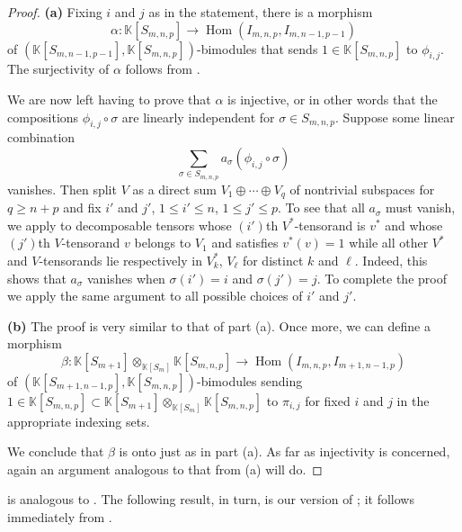 \documentclass[11pt]{article}
\theoremstyle{plain}
\theoremstyle{nonumberplain}
\theoremstyle{plain}
\theoremstyle{nonumberplain}
\newtheorem{proof}{Proof}
\newcommand\bK{{\mathbb K}}
\DeclareMathOperator{\Hom}{\mathrm{Hom}}
\begin{document}
\begin{proof}

{\bf (a)} Fixing $i$ and $j$ as in the statement, there is a morphism
\begin{equation*}
  \alpha:\bK[S_{m,n,p}] \to \Hom(I_{m,n,p},I_{m,n-1,p-1})
\end{equation*}
of $(\bK[S_{m,n-1,p-1}],\bK[S_{m,n,p}])$-bimodules that sends $1\in \bK[S_{m,n,p}]$ to $\phi_{i,j}$. 
The surjectivity of $\alpha$ follows from .

We are now left having to prove that $\alpha$ is injective, or in other words that the compositions $\phi_{i,j}\circ \sigma$ are linearly independent for $\sigma\in S_{m,n,p}$. 
Suppose some linear combination 
\begin{equation}\label{eq.le.11}
  \sum_{\sigma\in S_{m,n,p}} a_\sigma (\phi_{i,j}\circ \sigma)
\end{equation}
vanishes. Then split $V$ as a direct sum $V_1\oplus\cdots\oplus V_q$ of nontrivial subspaces for $q\ge n+p$ and fix $i'$ and $j'$, $1\leq i'\leq n$, $1\leq j'\leq p$. %
To see that all $a_\sigma$ must vanish, we apply  to decomposable tensors whose $(i')$th $V^*$-tensorand is $v^*$ and whose $(j')$th $V$-tensorand $v$ belongs to $V_1$ and satisfies $v^*(v)=1$ while all other $V^*$ and $V$-tensorands lie respectively in $V^*_k$, $V_\ell$ for distinct $k$ and $\ell$. Indeed, this shows that $a_\sigma$ vanishes when $\sigma(i')=i$ and $\sigma(j')=j$.  To complete the proof we apply the same argument to all possible choices of $i'$ and $j'$. 



{\bf (b)} The proof is very similar to that of part (a). Once more, we can define a morphism
\begin{equation*}
  \beta:\bK[S_{m+1}]\otimes_{\bK[S_m]}\bK[S_{m,n,p}]\to \Hom(I_{m,n,p},I_{m+1,n-1,p})
\end{equation*}
of $(\bK[S_{m+1,n-1,p}],\bK[S_{m,n,p}])$-bimodules sending $1\in \bK[S_{m,n,p}]\subset \bK[S_{m+1}]\otimes_{\bK[S_m]}\bK[S_{m,n,p}]$ to $\pi_{i,j}$ for fixed $i$ and $j$ in the appropriate indexing sets.

We conclude that $\beta$ is onto just as in part (a). As far as injectivity is concerned, again an argument analogous to that from (a) will do. 
\end{proof}



 is analogous to \cite[Lemma 6.1 + part (1) of Lemma 6.2]{DPS}. The following result, in turn, is our version of \cite[part (2) of Lemma 6.2]{DPS}; it follows immediately from . 
\end{document}

